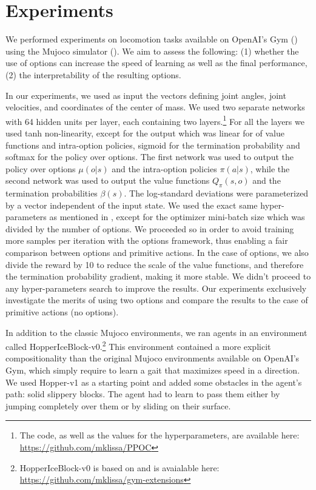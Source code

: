 \documentclass{article}
\def\option{o}
\begin{document}
\section{Experiments}
We performed experiments on locomotion tasks available on OpenAI's Gym (\cite{BrockmanCPSSTZ16}) using the Mujoco simulator (\cite{Todorov2012MuJoCoAP}).  We aim to assess the following: (1) whether the use of options can increase the speed of learning as well as the final performance, (2) the interpretability of the resulting options.

In our experiments, we used as input the vectors defining joint angles, joint velocities, and coordinates of the center of mass. We used two separate networks with 64 hidden units per layer, each containing two layers.\footnote{The code, as well as the values for the hyperparameters, are available here: \url{https://github.com/mklissa/PPOC}} For all the layers we used tanh non-linearity, except for the output which was linear for of value functions and intra-option policies, sigmoid for the termination probability and softmax for the policy over options. The first network was used to output the policy over options $\mu(\option | s)$ and the intra-option policies $\pi(a | s)$, while the second network was used to output the value functions $Q_\pi(s,\option)$ and the termination probabilities $\beta(s)$. The log-standard deviations were parameterized by a vector independent of the input state. 
We used the exact same hyper-parameters as mentioned in \cite{SchulmanWDRK17}, except for the optimizer mini-batch size which was divided by the number of options. We proceeded so in order to avoid training more samples per iteration with the options framework, thus enabling a fair comparison between options and primitive actions. In the case of options, we also divide the reward by 10 to reduce the scale of the value functions, and therefore the termination probability gradient, making it more stable.  We didn't proceed to any hyper-parameters search to improve the results. Our experiments exclusively investigate the merits of using two options and compare the results to the case of primitive actions (no options).

In addition to the classic Mujoco environments, we ran agents in an environment called HopperIceBlock-v0.\footnote{HopperIceBlock-v0 is based on \cite{henderson2017multitask} and is avaialable here: \url{https://github.com/mklissa/gym-extensions}} This environment contained a more explicit compositionality than the original Mujoco environments available on OpenAI's Gym, which simply require  to learn a gait that maximizes speed in a direction. We used Hopper-v1 as a starting point and added some obstacles in the agent's path: solid slippery blocks. The agent had to learn to pass them either by jumping completely over them or by sliding on their surface.
\end{document}
